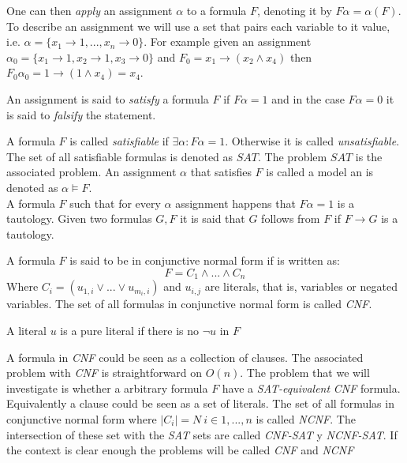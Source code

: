 \begin{definition}
    
    One can then \emph{apply} an assignment $\alpha$ to a formula $F$, denoting it by $F\alpha=\alpha(F)$. To describe an assignment we will use a set that pairs each variable to it value, i.e. $\alpha=\{x_1\to 1,...,x_n\to 0\}$. For example given an assignment $\alpha_0 = \{x_1 \to 1, x_2\to 1, x_3 \to 0\}$ and $F_0=x_1\to (x_2\wedge x_4)$ then  $F_0\alpha_0=1 \to (1\wedge x_4)= x_4$. \\
    
    \begin{definition}
      An assignment is said to \emph{satisfy}  a formula $F$ if $F\alpha=1$ and in the case $F  \alpha = 0 $ it is said to \emph{falsify} the statement.
    \end{definition}
    
    \begin{definition}
      A formula $F$ is called \emph{satisfiable} if $\exists \alpha : F\alpha = 1.$ Otherwise it is called \emph{unsatisfiable}. The set of all satisfiable formulas is denoted as $SAT$.  The problem $SAT$ is the associated problem. 	An assignment $\alpha$ that satisfies $F$ is called a model an is denoted as $\alpha \models F$.\\
      
      
      A formula $F$ such that for every  $\alpha$ assignment happens that $F\alpha=1$ is a tautology. Given two formulas $G,F$ it is said that $G$ follows from $F$ if $F\rightarrow G$ is a tautology. \\
    \end{definition}
    
    
    
    \begin{definition}
      A formula $F$ is said to be in conjunctive normal form if is written as:
      $$F = C_1\wedge ... \wedge C_n$$
      Where $C_i = (u_{1,i} \vee ... \vee u_{m_i,i})$  and $u_{i,j}$ are literals, that is, variables or negated variables. The set of all formulas in conjunctive normal form is called \emph{CNF}.

      A literal $u$ is a pure literal if there is no $\neg u$ in $F$
    \end{definition}
    
    A formula in \emph{CNF} could be seen as a collection of clauses. The associated problem with \emph{CNF} is straightforward on $O(n)$. The problem that we will investigate is whether a arbitrary formula $F$ have a \emph{SAT-equivalent} \emph{CNF} formula.
    Equivalently a clause could be seen as a set of literals. The set of all formulas in conjunctive normal form where $|C_i| = N\ i \in 1,...,n$ is called \emph{NCNF}. The intersection of these set with the \emph{SAT} sets are called \emph{CNF-SAT} y \emph{NCNF-SAT}. If the context is clear enough the problems will be called \emph{CNF} and \emph{NCNF}\\



\end{definition}

